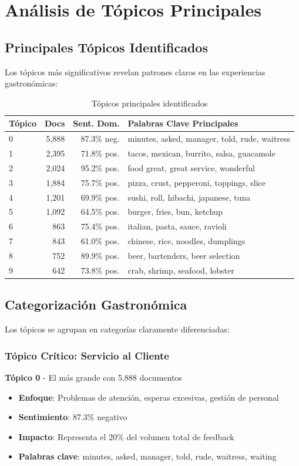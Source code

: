 \documentclass[12pt,a4paper,twoside,openany]{book}
\begin{document}
\section{Análisis de Tópicos Principales}

\subsection{Principales Tópicos Identificados}

Los tópicos más significativos revelan patrones claros en las experiencias gastronómicas:

\begin{table}[H]
\centering
\caption{Tópicos principales identificados}
\begin{tabular}{@{}lrrl@{}}
\toprule
\textbf{Tópico} & \textbf{Docs} & \textbf{Sent. Dom.} & \textbf{Palabras Clave Principales} \\
\midrule
0 & 5,888 & 87.3\% neg. & minutes, asked, manager, told, rude, waitress \\
1 & 2,395 & 71.8\% pos. & tacos, mexican, burrito, salsa, guacamole \\
2 & 2,024 & 95.2\% pos. & food great, great service, wonderful \\
3 & 1,884 & 75.7\% pos. & pizza, crust, pepperoni, toppings, slice \\
4 & 1,201 & 69.9\% pos. & sushi, roll, hibachi, japanese, tuna \\
5 & 1,092 & 64.5\% pos. & burger, fries, bun, ketchup \\
6 & 863 & 75.4\% pos. & italian, pasta, sauce, ravioli \\
7 & 843 & 61.0\% pos. & chinese, rice, noodles, dumplings \\
8 & 752 & 89.9\% pos. & beer, bartenders, beer selection \\
9 & 642 & 73.8\% pos. & crab, shrimp, seafood, lobster \\
\bottomrule
\end{tabular}
\end{table}

\subsection{Categorización Gastronómica}

Los tópicos se agrupan en categorías claramente diferenciadas:

\subsubsection{Tópico Crítico: Servicio al Cliente}
\textbf{Tópico 0} - El más grande con 5,888 documentos
\begin{itemize}
    \item \textbf{Enfoque}: Problemas de atención, esperas excesivas, gestión de personal
    \item \textbf{Sentimiento}: 87.3\% negativo
    \item \textbf{Impacto}: Representa el 20\% del volumen total de feedback
    \item \textbf{Palabras clave}: minutes, asked, manager, told, rude, waitress, waiting
\end{itemize}
\end{document}
